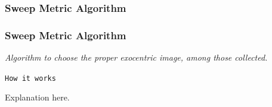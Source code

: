 \subsubsection{Sweep Metric Algorithm}
\frame
{
  \frametitle{Sweep Metric Algorithm}
  
  \emph{Algorithm to choose the proper \textit{exocentric} image,
    among those collected.}
  \pause

  \begin{block} {\alert{\texttt{How it works}}}
    
    \begin{center}
    \end{center}
    
    \footnotesize{
      Explanation here.
    }
  \end{block}
}
